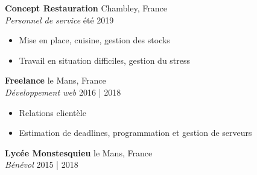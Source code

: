 \documentclass[a4paper]{article}
\newcommand\en[1]{}
\newcommand\fr[1]{#1}
\begin{document}
    \textbf{Concept Restauration}
        \hfill Chambley, France\\
        \en{ \textit{Service worker} \hfill Summer of 2019\\}
        \fr{ \textit{Personnel de service} \hfill été 2019\\}
        \vspace{-1mm}
        \begin{itemize} \itemsep 1pt
            \item
                \en{set up, cooking, inventory management}
                \fr{Mise en place, cuisine, gestion des stocks}
            \item
                \en{Work in difficult situations, stress management}
                \fr{Travail en situation difficiles, gestion du stress}
        \end{itemize}
    \textbf{Freelance}
        \hfill le Mans, France\\
        \en{ \textit{Web development}}
        \fr{ \textit{Développement web}}
        \hfill 2016 | 2018\\
        \vspace{-1mm}
        \begin{itemize} \itemsep 1pt
            \item
                \en{Creation of designs in accordance to the will of the clients}
                \fr{Relations clientèle}
            \item
                \en{Deadline estimation, programming and server management}
                \fr{Estimation de deadlines, programmation et gestion de serveurs}
        \end{itemize}
    \textbf{Lycée Monstesquieu}
        \hfill le Mans, France\\
        \en{\textit{Volunteer}}
        \fr{\textit{Bénévol}}
        \hfill 2015 | 2018\\
        \vspace{-1mm}
\end{document}
